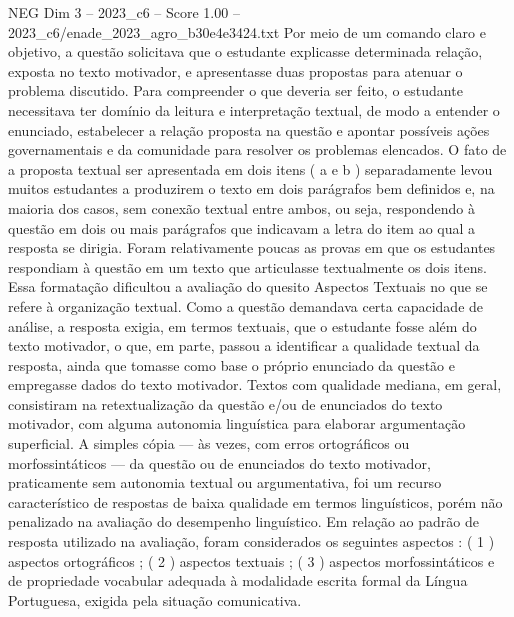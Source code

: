 \begin{textsample}{NEG Dim 3 – 2023\_c6 – Score 1.00 – 2023\_c6/enade\_2023\_agro\_b30e4e3424.txt}
Por meio de um comando claro e objetivo, a questão solicitava que o estudante explicasse determinada relação, exposta no texto motivador, e apresentasse duas propostas para atenuar o problema discutido.
Para compreender o que deveria ser feito, o estudante necessitava ter domínio da leitura e interpretação textual, de modo a entender o enunciado, estabelecer a relação proposta na questão e apontar possíveis ações governamentais e da comunidade para resolver os problemas elencados.
O fato de a proposta textual ser apresentada em dois itens ( a e b ) separadamente levou muitos estudantes a produzirem o texto em dois parágrafos bem definidos e, na maioria dos casos, sem conexão textual entre ambos, ou seja, respondendo à questão em dois ou mais parágrafos que indicavam a letra do item ao qual a resposta se dirigia.
Foram relativamente poucas as provas em que os estudantes respondiam à questão em um texto que articulasse textualmente os dois itens.
Essa formatação dificultou a avaliação do quesito Aspectos Textuais no que se refere à organização textual.
Como a questão demandava certa capacidade de análise, a resposta exigia, em termos textuais, que o estudante fosse além do texto motivador, o que, em parte, passou a identificar a qualidade textual da resposta, ainda que tomasse como base o próprio enunciado da questão e empregasse dados do texto motivador.
Textos com qualidade mediana, em geral, consistiram na retextualização da questão e/ou de enunciados do texto motivador, com alguma autonomia linguística para elaborar argumentação superficial.
A simples cópia — às vezes, com erros ortográficos ou morfossintáticos — da questão ou de enunciados do texto motivador, praticamente sem autonomia textual ou argumentativa, foi um recurso característico de respostas de baixa qualidade em termos linguísticos, porém não penalizado na avaliação do desempenho linguístico.
Em relação ao padrão de resposta utilizado na avaliação, foram considerados os seguintes aspectos : ( 1 ) aspectos ortográficos ; ( 2 ) aspectos textuais ; ( 3 ) aspectos morfossintáticos e de propriedade vocabular adequada à modalidade escrita formal da Língua Portuguesa, exigida pela situação comunicativa.

\end{textsample}
